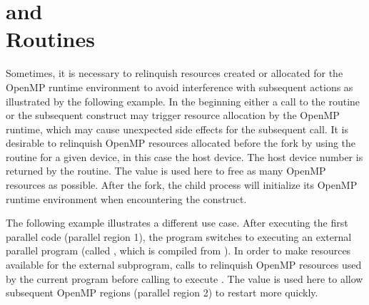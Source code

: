 \pagebreak
\section{ and \\
   Routines}
\label{sec:pause_resource}

Sometimes, it is necessary to relinquish resources created or allocated
for the OpenMP runtime environment to avoid interference with subsequent
actions as illustrated by the following example.  In the beginning 
either a call to the  routine 
or the subsequent  construct may trigger resource allocation
by the OpenMP runtime, which may cause unexpected side effects 
for the subsequent  call.
It is desirable to relinquish OpenMP resources allocated before 
the fork by using the  routine for a given
device, in this case the host device.  The host device number is returned by 
the  routine.
The  value is used here to free as many
OpenMP resources as possible.
After the fork, the child process will initialize its OpenMP runtime
environment when encountering the  construct.


The following example illustrates a different use case. 
After executing the first parallel code (parallel region 1), 
the  program switches to executing an external parallel program
(called , which is compiled from ).  
In order to make resources available for the external
subprogram,  calls 
to relinquish OpenMP resources used by the current program before
calling  to execute .
The  value is used here to allow subsequent
OpenMP regions (parallel region 2) to restart more quickly.


